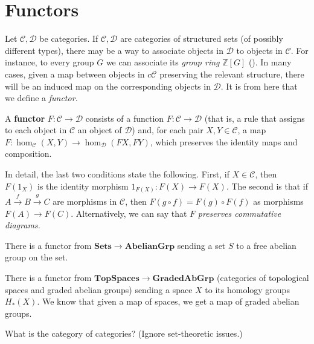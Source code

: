 \section{Functors}
Let $\mathcal{C}, \mathcal{D}$ be categories. If $\mathcal{C}, \mathcal{D}$
are categories of structured sets (of possibly different types), there may be a
way to associate objects in $\mathcal{D}$ to objects in $\mathcal{C}$. For
instance, to every group $G$ we can associate its \emph{group ring}
$\mathbb{Z}[G]$
 ().
In many cases, given a map between objects in $c\mathcal{C}$ preserving the
relevant structure, there will be an induced map on the corresponding objects
in $\mathcal{D}$. It is from here that we define a \emph{functor.}

\begin{definition}
A \textbf{functor} $F: \mathcal{C} \to \mathcal{D}$ consists of a function $F:
\mathcal{C} \to  \mathcal{D}$ (that is, a rule that assigns to each object
in $\mathcal{C}$ an object of $\mathcal{D}$) and, for each pair $X, Y \in
\mathcal{C}$,
a map
$F: \hom_{\mathcal{C}}(X, Y) \to \hom_{\mathcal{D}}(FX, FY)$, which preserves
the identity
maps and composition.
\end{definition}

In detail, the last two conditions state the following. First, if $X \in
\mathcal{C}$, then $F(1_X)$ is the identity morphism $1_{F(X)}: F(X) \to F(X)$. 
The second is that if $A \stackrel{f}{\to} B \stackrel{g}{\to} C$ are
morphisms in $\mathcal{C}$, 
then $F(g \circ f) = F(g) \circ F(f)$ as morphisms $F(A) \to F(C)$.
Alternatively, we can say that $F$ \emph{preserves commutative diagrams.}

\begin{example}
There is a functor from $\mathbf{Sets} \to \mathbf{AbelianGrp}$ sending a set
$S$ to a free abelian group on the set.
\end{example}

\begin{example}
There is a functor from $\mathbf{TopSpaces} \to \mathbf{GradedAbGrp}$
(categories of topological spaces and graded abelian groups) sending a
space $X$ to its homology groups $H_*(X)$. We know that given a map of spaces,
we get a map of graded abelian groups.
\end{example}

\begin{exercise}
What is the category of categories? (Ignore set-theoretic issues.)
\end{exercise}


